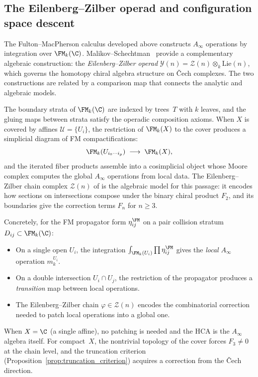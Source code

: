
\subsection{The Eilenberg--Zilber operad and configuration space
descent}
\label{subsec:ez-operad-fm}

The Fulton--MacPherson calculus developed above constructs
$A_\infty$ operations by integration over $\FM_k(\C)$.
Malikov--Schechtman~\cite{MS24} provide a complementary algebraic
construction: the \emph{Eilenberg--Zilber operad}
$\mathcal{Y}(n) = \mathcal{Z}(n) \otimes_k \mathrm{Lie}(n)$,
which governs the homotopy chiral algebra structure on \v{C}ech
complexes. The two constructions are related by a comparison map
that connects the analytic and algebraic models.

\begin{remark}
\label{rem:fm-strata-simplicial}
The boundary strata of $\FM_k(\C)$ are indexed by trees~$T$
with $k$ leaves, and the gluing maps between strata satisfy
the operadic composition axioms. When $X$ is covered by
affines $\mathcal{U} = \{U_i\}$, the restriction of
$\FM_k(X)$ to the cover produces a simplicial diagram of
FM compactifications:
\[
\FM_k(U_{i_0 \cdots i_p})
\;\longrightarrow\;
\FM_k(X),
\]
and the iterated fiber products assemble into a cosimplicial
object whose Moore complex computes the global $A_\infty$
operations from local data. The Eilenberg--Zilber chain
complex $\mathcal{Z}(n)$ of \cite{MS24} is the algebraic
model for this passage: it encodes how sections on
intersections compose under the binary chiral product
$F_2$, and its boundaries give the correction terms
$F_n$ for $n \geq 3$.

Concretely, for the FM propagator form
$\eta_{ij}^{\FM}$ on a pair collision stratum
$D_{ij} \subset \FM_k(\C)$:
\begin{itemize}
\item On a single open $U_i$, the integration
 $\int_{\FM_k(U_i)} \prod \eta_{ij}^{\FM}$ gives the
 \emph{local} $A_\infty$ operation $m_k^{U_i}$.
\item On a double intersection $U_i \cap U_j$, the
 restriction of the propagator produces a \emph{transition}
 map between local operations.
\item The Eilenberg--Zilber chain
 $\varphi \in \mathcal{Z}(n)$ encodes the combinatorial
 correction needed to patch local operations into a global
 one.
\end{itemize}
When $X = \C$ (a single affine), no patching is needed and
the HCA is the $A_\infty$ algebra itself. For compact~$X$,
the nontrivial topology of the cover forces $F_3 \neq 0$
at the chain level, and the truncation criterion
(Proposition~\ref{prop:truncation_criterion}) acquires
a correction from the \v{C}ech direction.
\end{remark}

